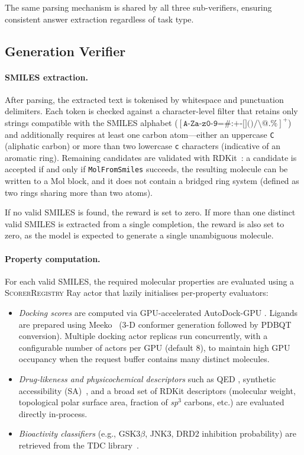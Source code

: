 The same parsing mechanism is shared by all three sub-verifiers, ensuring
consistent answer extraction regardless of task type.

\subsection{Generation Verifier}
\label{app:verifier:generation}

\paragraph{SMILES extraction.}
After parsing, the extracted text is tokenised by whitespace and punctuation
delimiters.  Each token is checked against a character-level filter that
retains only strings compatible with the SMILES alphabet
($[\texttt{A-Za-z0-9=\#:+-[]()/\textbackslash @.\%}]^+$)
and additionally requires at least one carbon atom—either an uppercase
\texttt{C} (aliphatic carbon) or more than two lowercase \texttt{c}
characters (indicative of an aromatic ring).  Remaining
candidates are validated with RDKit~\citep{rdkit}: a candidate is accepted if
and only if \texttt{MolFromSmiles} succeeds, the resulting molecule can be
written to a Mol block, and it does not contain a bridged ring system
(defined as two rings sharing more than two atoms).

If no valid SMILES is found, the reward is set to zero.  If more than one
distinct valid SMILES is extracted from a single completion, the reward is
also set to zero, as the model is expected to generate a single unambiguous
molecule.

\paragraph{Property computation.}
For each valid SMILES, the required molecular properties are evaluated using
a \textsc{ScorerRegistry} Ray actor that lazily initialises per-property
evaluators:

\begin{itemize}
  \item \textit{Docking scores} are computed via GPU-accelerated AutoDock-GPU
        \citep{autodock_gpu}.  Ligands are prepared using
        Meeko~\citep{meeko} (3-D conformer generation followed by
        PDBQT conversion).  Multiple docking actor replicas run concurrently,
        with a configurable number of actors per GPU (default 8), to maintain
        high GPU occupancy when the request buffer contains many distinct
        molecules.
  \item \textit{Drug-likeness and physicochemical descriptors} such as QED
        \citep{qed}, synthetic accessibility (SA)~\citep{sa_score},
        and a broad set of RDKit descriptors (molecular weight, topological
        polar surface area, fraction of \textit{sp}$^3$ carbons, etc.) are
        evaluated directly in-process.
  \item \textit{Bioactivity classifiers} (e.g., GSK3$\beta$, JNK3, DRD2
        inhibition probability) are retrieved from the TDC
        library~\citep{tdc}.
\end{itemize}

